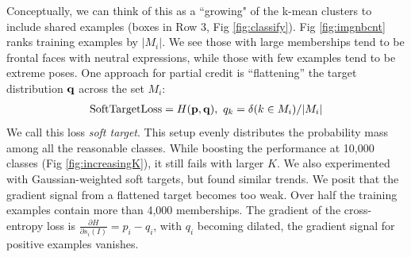 \documentclass[letterpaper]{article} %
\newcommand{\ie}{\textit{i.e.}}
\begin{document}
Conceptually, we can think of this as a ``growing" of the k-mean clusters to include shared examples (boxes in Row 3, Fig \ref{fig:classify}). Fig \ref{fig:imgnbcnt} ranks training examples by $|M_i|$. We see those with large memberships tend to be frontal faces with neutral expressions, while those with few examples tend to be extreme poses.
One approach for partial credit is ``flattening'' the target distribution ${\bf q}$ across the set $M_i$: 
\begin{align}
\label{eq:softtarget}
\text{SoftTargetLoss} = H({\bf p}, {\bf q}), \ q_k =  \delta(k \in M_i)/|M_i|
\end{align}
We call this loss {\em soft target}. This setup evenly distributes the probability mass among all the reasonable classes. While boosting the performance at 10,000 classes (Fig \ref{fig:increasingK}), it still fails with larger $K$. We also experimented with Gaussian-weighted soft targets, but found similar trends. We posit that the gradient signal from a flattened target becomes too weak. Over half the training examples contain more than 4,000 memberships. The gradient of the cross-entropy loss is $\frac{\partial H}{\partial s_i(I)} = p_i - q_i$, with $q_i$ becoming dilated, the gradient signal for positive examples vanishes.
\end{document}
